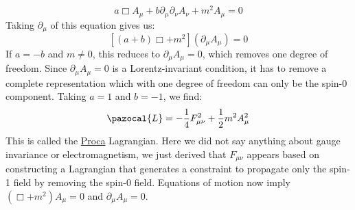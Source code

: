 \documentclass[../main.tex]{subfiles}
\begin{document}
\[
a\Box A_\mu+b\partial_\mu\partial_\nu A_\nu+m^2A_\mu=0
\]
Taking $\partial_\mu$ of this equation gives us:
\[
[(a+b)\Box+m^2](\partial_\mu A_\mu)=0
\]
If $a=-b$ and $m\neq0$, this reduces to $\partial_\mu A_\mu=0$, which removes one degree of freedom. Since $\partial_\mu A_\mu=0$ is a Lorentz-invariant condition, it has to remove a complete representation which with one degree of freedom can only be the spin-0 component. Taking $a=1$ and $b=-1$, we find:
\[
\pazocal{L}=-\frac{1}{4}F_{\mu\nu}^2+\frac{1}{2}m^2A_\mu^2
\]
This is called the \href{https://en.wikipedia.org/wiki/Alexandru_Proca}{Proca} Lagrangian. Here we did not say anything about gauge invariance or electromagnetism, we just derived that $F_{\mu\nu}$ appears based on constructing a Lagrangian that generates a constraint to propagate only the spin-1 field by removing the spin-0 field. Equations of motion now imply $(\Box+m^2)A_\mu=0$ and $\partial_\mu A_\mu=0$.
\end{document}
